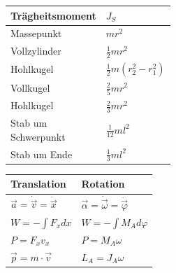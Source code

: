 \documentclass[12pt,a4paper]{article}
\renewcommand{\=}[1]{\stackrel{#1}{=}}
\theoremstyle{definition}
\theoremstyle{remark}
\begin{document}
\begin{center}
\begin{minipage}[t]{.6\linewidth}
\begin{tabular}{ll}
\end{tabular}
\end{minipage}%
\begin{minipage}[t]{.4\linewidth}
\vspace{0pt}
\centering
\begin{tabular}{ll}
Trägheitsmoment & $J_S$\\
\midrule
Massepunkt & $mr^2$ \\
Vollzylinder & $\frac{1}{2}mr^2$ \\
Hohlkugel & $\frac{1}{2}m(r_2^2 - r_1^2)$ \\
Vollkugel & $\frac{2}{5}mr^2$ \\
Hohlkugel & $\frac{2}{3}mr^2$ \\
\makecell[l]{Stab um \\Schwerpunkt} & $\frac{1}{12}ml^2$ \\
Stab um Ende & $\frac{1}{3}ml^2$
\end{tabular}
\vspace{22.5pt}
\begin{flushleft}
\begin{tabular}{ll}
Translation & Rotation\\
\midrule
$\vec{a} = \dot{\vec{v}} = \ddot{\vec{x}}$ & $\vec{\alpha} = \dot{\vec{\omega}} = \ddot{\vec{\varphi}}$\\
$W = -\int F_x dx$ & $W = -\int M_A d \varphi$ \\
$P = F_xv_x$ & $P = M_A \omega$ \\
$\vec{p} = m \cdot \vec{v}$ & $L_A = J_A \omega$ \\
\end{tabular}
\end{flushleft}
\end{minipage}
\end{center}
\end{document}
